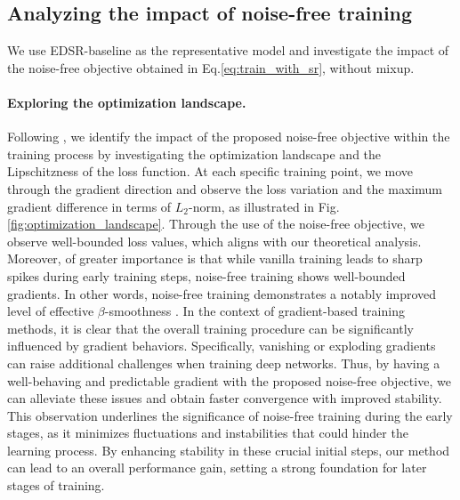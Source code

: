 \documentclass[letterpaper]{article} %
\begin{document}
\subsection{Analyzing the impact of noise-free training} \label{section:analysis}
We use EDSR-baseline \cite{SISR2_EDSR} as the representative model and investigate the impact of the noise-free objective obtained in Eq.\eqref{eq:train_with_sr}, without mixup.

%
\paragraph{Exploring the optimization landscape.}
Following \cite{how_does_batchnorm_help}, we identify the impact of the proposed noise-free objective within the training process by investigating the optimization landscape and the Lipschitzness of the loss function.
%
At each specific training point, we move through the gradient direction and observe the loss variation and the maximum gradient difference in terms of $L_2$-norm, as illustrated in Fig.\ref{fig:optimization_landscape}.
%
Through the use of the noise-free objective, we observe well-bounded loss values, which aligns with our theoretical analysis. 
Moreover, of greater importance is that while vanilla training leads to sharp spikes during early training steps, noise-free training shows well-bounded gradients.
In other words, noise-free training demonstrates a notably improved level of effective $\beta$-smoothness \cite{beta_smoothness, how_does_batchnorm_help}. 
%
In the context of gradient-based training methods, it is clear that the overall training procedure can be significantly influenced by gradient behaviors. Specifically, vanishing or exploding gradients can raise additional challenges when training deep networks.
Thus, by having a well-behaving and predictable gradient with the proposed noise-free objective, we can alleviate these issues and obtain faster convergence with improved stability.
%
This observation underlines the significance of noise-free training during the early stages, as it minimizes fluctuations and instabilities that could hinder the learning process. By enhancing stability in these crucial initial steps, our method can lead to an overall performance gain, setting a strong foundation for later stages of training.
%
%
%
% 
%
\end{document}
